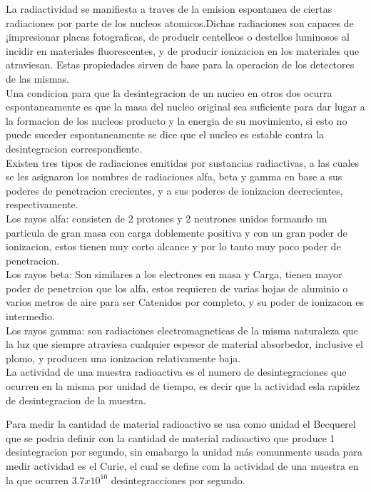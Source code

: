 \documentclass[11pt, oneside]{book}
\begin{document}
La radiactividad se manifiesta a traves de la emision espontanea
de ciertas radiaciones por parte de los nucleos atomicos.Dichas
radiaciones son capaces de ¡impresionar placas fotograficas, de producir centelleos
o destellos luminosos al incidir en materiales fluorescentes, y de producir ionizacion en los materiales que atraviesan. Estas propiedades sirven de base para la operacion de los detectores de las mismas.\\

Una condicion para que la desintegracion de un nucieo en otros
dos ocurra espontaneamente es que la masa del nucleo original
sea suficiente para dar lugar a la formacion de los nucleos
producto y la energia de su movimiento, si esto no puede suceder
espontaneamente se dice que el nucleo es estable contra la desintegracion correspondiente.\\

Existen tres tipos de radiaciones emitidas por sustancias
radiactivas, a las cuales se les asignaron los nombres de
radiaciones alfa, beta y gamma en base a sus poderes de
penetracion crecientes, y a sus poderes de ionizacion
decrecientes, respectivamente.\\

Los rayos alfa: consisten de 2 protones y 2 neutrones unidos
formando un particula de gran masa con carga doblemente positiva
y con un gran poder de ionizacion, estos tienen muy corto alcance
y por lo tanto muy poco poder de penetracion.\\

Los rayos beta: Son similares a los electrones en masa y Carga,
tienen mayor poder de penetrcion que los alfa, estos requieren
de varias hojas de aluminio o varios metros de aire para ser
Catenidos por completo, y su poder de ionizacon es intermedio.\\

Los rayos gamma: son radiaciones electromagneticas de la misma naturaleza que la luz que siempre atraviesa cualquier espesor de material absorbedor, inclusive el plomo, y producen una ionizacion relativamente baja.\\

La actividad de una muestra radioactiva es el numero de desintegraciones que ocurren en la misma por unidad de tiempo, es decir que la actividad esla rapidez de desintegracion de la muestra.

Para medir la cantidad de material radioactivo se usa como unidad el Becquerel que se podria definir con la cantidad de material radioactivo que produce 1 desintegracion por segundo, sin emabargo la unidad más comunmente usada para medir actividad es el Curie, el cual se define com la actividad de una muestra en la que ocurren $3.7 x 10^{10}$ desintegracciones por segundo.\\
\end{document}
